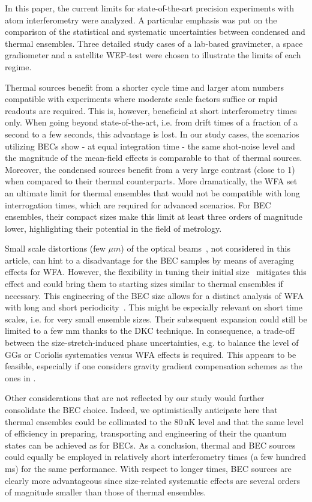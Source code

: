 In this paper, the current limits for state-of-the-art precision experiments with atom interferometry were analyzed. A particular emphasis was put on the comparison of the statistical and systematic uncertainties between condensed and thermal ensembles. Three detailed study cases of a lab-based gravimeter, a space gradiometer and a satellite WEP-test were chosen to illustrate the limits of each regime.

Thermal sources benefit from a shorter cycle time and larger atom numbers compatible with experiments where moderate scale factors suffice or rapid readouts are required. This is, however, beneficial at short interferometry times only. When going beyond state-of-the-art, i.e. from drift times of a fraction of a second to a few seconds, this advantage is lost.
In our study cases, the scenarios utilizing BECs show - at equal integration time - the same shot-noise level and the magnitude of the mean-field effects is comparable to that of thermal sources. 
Moreover, the condensed sources benefit from a very large contrast (close to 1) when compared to their thermal counterparts. 
More dramatically, the WFA set an ultimate limit for thermal ensembles that would not be compatible with long interrogation times, which are required for advanced scenarios. 
For BEC ensembles, their compact sizes make this limit at least three orders of magnitude lower, highlighting their potential in the field of metrology.

Small scale distortions (few $\mu m$) of the optical beams~\cite{Bade2018}, not considered in this article, can hint to a disadvantage for the BEC samples by means of averaging effects for WFA.
However, the flexibility in tuning their initial size~\cite{Corgier2020} mitigates this effect and could bring them to starting sizes similar to thermal ensembles if necessary. 
This engineering of the BEC size allows for a distinct analysis of WFA with long and short periodicity~\cite{LouchetChauvet2011,Karcher2018}. 
This might be especially relevant on short time scales, i.e. for very small ensemble sizes. Their subsequent expansion could still be limited to a few mm thanks to the DKC technique. 
In consequence, a trade-off between the size-stretch-induced phase uncertainties, e.g. to balance the level of GGs or Coriolis systematics versus WFA effects is required. 
This appears to be feasible, especially if one considers gravity gradient compensation schemes as the ones in \cite{Loriani2020,Trimeche2019,Roura2017}.

Other considerations that are not reflected by our study would further consolidate the BEC choice. Indeed, we optimistically anticipate here that thermal ensembles could be collimated to the 80\,nK level and that the same level of efficiency in preparing, transporting and engineering of their the quantum states can be achieved as for BECs.
As a conclusion, thermal and BEC sources could equally be employed in relatively short interferometry times (a few hundred ms) for the same performance. With respect to longer times, BEC sources are clearly more advantageous since size-related systematic effects are several orders of magnitude smaller than those of thermal ensembles.

